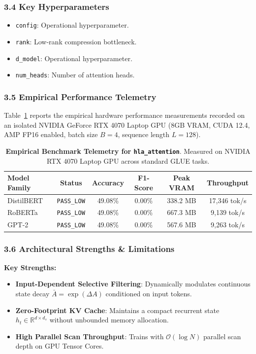 \subsubsection*{3.4 Key Hyperparameters}
\begin{itemize}
    \item \texttt{config}: Operational hyperparameter.
    \item \texttt{rank}: Low-rank compression bottleneck.
    \item \texttt{d\_model}: Operational hyperparameter.
    \item \texttt{num\_heads}: Number of attention heads.
\end{itemize}

\subsubsection*{3.5 Empirical Performance Telemetry}
Table~\ref{tab:telemetry_hla_attention} reports the empirical hardware performance measurements recorded on an isolated NVIDIA GeForce RTX 4070 Laptop GPU (8GB VRAM, CUDA 12.4, AMP FP16 enabled, batch size $B=4$, sequence length $L=128$).

\begin{table}[h]
\centering
\small
\caption{\textbf{Empirical Benchmark Telemetry for \texttt{hla\_attention}}. Measured on NVIDIA RTX 4070 Laptop GPU across standard GLUE tasks.}
\label{tab:telemetry_hla_attention}
\begin{tabular*}{\columnwidth}{@{\extracolsep{\fill}}lccccc}
\toprule
\textbf{Model Family} & \textbf{Status} & \textbf{Accuracy} & \textbf{F1-Score} & \textbf{Peak VRAM} & \textbf{Throughput} \\
\midrule
DistilBERT & \texttt{PASS\_LOW} & 49.08\% & 0.00\% & 338.2 MB & 17,346 tok/s \\
RoBERTa & \texttt{PASS\_LOW} & 49.08\% & 0.00\% & 667.3 MB & 9,139 tok/s \\
GPT-2 & \texttt{PASS\_LOW} & 49.08\% & 0.00\% & 567.6 MB & 9,263 tok/s \\
\bottomrule
\end{tabular*}
\end{table}

\subsubsection*{3.6 Architectural Strengths \& Limitations}
\textbf{Key Strengths:}
\begin{itemize}
    \item \textbf{Input-Dependent Selective Filtering}: Dynamically modulates continuous state decay $\bar{A} = \exp(\Delta A)$ conditioned on input tokens.
    \item \textbf{Zero-Footprint KV Cache}: Maintains a compact recurrent state $h_t \in \mathbb{R}^{d \times d_s}$ without unbounded memory allocation.
    \item \textbf{High Parallel Scan Throughput}: Trains with $\mathcal{O}(\log N)$ parallel scan depth on GPU Tensor Cores.
\end{itemize}

